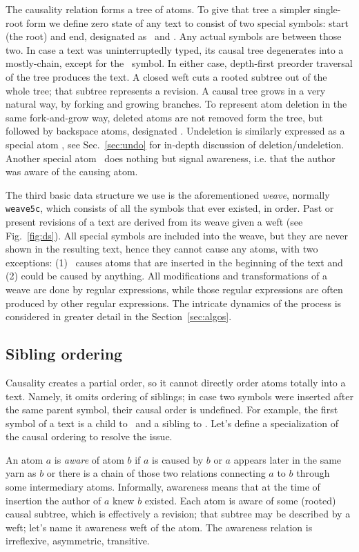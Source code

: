\documentclass{acm_proc_article-sp}
\begin{document}
The causality relation forms a tree of atoms.
To give that tree a simpler single-root form we define zero state of any text to consist of two special symbols: start (the root) and end, designated as \aum ~and \eoa.
Any actual symbols are between those two.
In case a text was uninterruptedly typed, its causal tree degenerates into a mostly-chain, except for the \eoa ~symbol.
In either case, depth-first preorder traversal of the tree produces the text.
A closed weft cuts a rooted subtree out of the whole tree; that subtree represents a revision.
A causal tree grows in a very natural way, by forking and growing branches.
To represent atom deletion in the same fork-and-grow way, deleted atoms are not removed form the tree, but followed by backspace atoms, designated \bsp. 
Undeletion is similarly expressed as a special atom \cnc, see Sec.~\ref{sec:undo} for in-depth discussion of deletion/undeletion.
Another special atom \zero ~does nothing but signal awareness, i.e. that the author was aware of the causing atom.

The third basic data structure we use is the aforementioned \emph{weave}, normally {\tt weave5c}, which consists of all the symbols that ever existed, in order. 
Past or present revisions of a text are derived from its weave given a weft (see Fig.~\ref{fig:ds}).
All special symbols are included into the weave, but they are never shown in the resulting text, hence they cannot cause any atoms, with two exceptions: (1) \aum ~causes atoms that are inserted in the beginning of the text and (2) \zero could be caused by anything.
All modifications and transformations of a weave are done by regular expressions, while those regular expressions are often produced by other regular expressions.
The intricate dynamics of the process is considered in greater detail in the Section~\ref{sec:algos}.


\subsection {Sibling ordering}  \label{sec:siblord}

Causality creates a partial order, so it cannot directly order atoms totally into a text.
Namely, it omits ordering of siblings; in case two symbols were inserted after the same parent symbol, their causal order is undefined.
For example, the first symbol of a text is a child to \aum ~and a sibling to \eoa.
Let's define a specialization of the causal ordering to resolve the issue.

An atom $a$ is \emph{aware} of atom $b$ if $a$ is caused by $b$ or $a$ appears later in the same yarn as $b$ or there is a chain of those two relations connecting $a$ to $b$ through some intermediary atoms.
Informally, awareness means that at the time of insertion the author of $a$ knew $b$ existed. 
Each atom is aware of some (rooted) causal subtree, which is effectively a revision; that subtree may be described by a weft; let's name it awareness weft of the atom.
The awareness relation is irreflexive, asymmetric, transitive.
\end{document}
